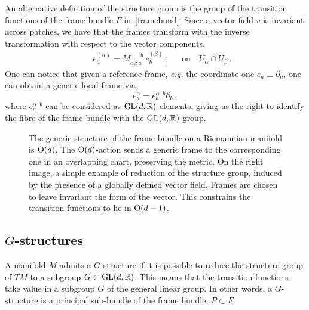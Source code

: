 \documentclass[debug]{phd}
\begin{document}
					An alternative definition of the structure group is the group of the transition functions of the frame bundle $F$ in~\eqref{framebund}.
					Since a vector field $v$ is invariant across patches, we have that the frames transform with the inverse transformation with respect to the vector components,
							\begin{align}
								& & & & & & e_a^{(\alpha)} = M_{\alpha\beta\, a }^{\phantom{\alpha \beta a} b }\ e_b^{(\beta)}\, ,& & \mbox{on}\quad U_\alpha \cap U_\beta \, .& & & &
							\end{align}
					One can notice that given a reference frame, \emph{e.g.} the coordinate one $e_a \equiv \partial_a$, one can obtain a generic local frame via,
							\begin{equation}
								e^{\alpha}_a = e^{\alpha\phantom{a}b}_a \partial_b\, ,
							\end{equation}
					where $e^{\alpha\phantom{a}b}_a$ can be considered as $\mathrm{GL}(d,\mathbb{R})$ elements, giving us the right to identify the fibre of the frame bundle with the $\mathrm{GL}(d, \mathbb{R})$ group.
					
							\begin{figure}[h]
							\centering
									\scalebox{1}{}%
								\qquad \qquad
									\scalebox{1}{}
								\caption{%
									The generic structure of the frame bundle on a Riemannian manifold is $\mathrm{O}(d)$. 
									The $\mathrm{O}(d)$-action sends a generic frame to the corresponding one in an overlapping chart, preserving the metric. 
									On the right image, a simple example of reduction of the structure group, induced by the presence of a globally defined vector field.
									Frames are chosen to leave invariant the form of the vector.
									This constrains the transition functions to lie in $\mathrm{O}(d-1)$.}
								\label{figpatches}
							\end{figure}
			\subsection{\texorpdfstring{$G$-structures}{G-structures}}
					A manifold $M$	 admits a $G$-structure if it is possible to reduce the structure group of $TM$ to a subgroup $G \subset \mathrm{GL}(d, \mathbb{R})$.
					This means that the transition functions take value in a subgroup $G$ of the general linear group.
					In other words, a $G$-structure is a principal sub-bundle of the frame bundle, $P \subset F$.
					
\end{document}

